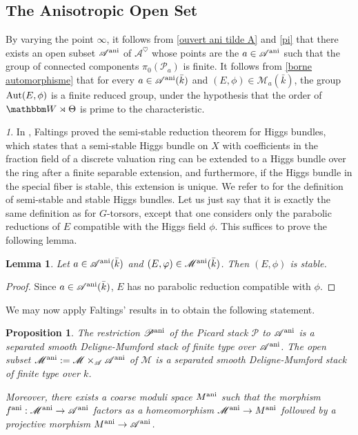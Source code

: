 \documentclass[12pt,english]{smfart}
\numberwithin{equation}{subsection}
\newtheorem{lemme}[equation]{Lemma}
\newtheorem{proposition}[equation]{Proposition}
\theoremstyle{remark}
\newtheorem{numero}[equation]{}
\newcommand\calA{{\mathscr A}}
\newcommand\calP{{\mathscr P}}
\newcommand\calM{{\mathscr M}}
\newcommand\bbW{{\mathbbm W}}
\newcommand\Aut{{\rm Aut}}
\newcommand\ani{{\rm ani}}
\begin{document}
\subsection{The Anisotropic Open Set}
\label{subsection : ouvert anisotrope}

By varying the point $\infty$, it follows from \ref{ouvert ani tilde A} and \ref{pi} that there exists an open subset $\calA^\ani$ of $\calA^\heartsuit$ whose points are the $a\in\calA^\ani$ such that the group of connected components $\pi_0(\calP_a)$ is finite. It follows from \ref{borne automorphisme} that for every $a\in\calA^\ani(\bar k)$ and $(E,\phi)\in\calM_a(\bar k)$, the group $\Aut(E,\phi)$ is a finite reduced group, under the hypothesis that the order of $\bbW\rtimes\Theta$ is prime to the characteristic.

\begin{numero}\label{ani auto}
In \cite[II.4]{Fa}, Faltings proved the semi-stable reduction theorem for Higgs bundles, which states that a semi-stable Higgs bundle on $X$ with coefficients in the fraction field of a discrete valuation ring can be extended to a Higgs bundle over the ring after a finite separable extension, and furthermore, if the Higgs bundle in the special fiber is stable, this extension is unique. We refer to \cite{Fa} for the definition of semi-stable and stable Higgs bundles. Let us just say that it is exactly the same definition as for $G$-torsors, except that one considers only the parabolic reductions of $E$ compatible with the Higgs field $\phi$. This suffices to prove the following lemma.
\end{numero}

\begin{lemme}\label{ani > stable}
Let $a\in\calA^\ani(\bar k)$ and $(E,\varphi)\in\calM^\ani(\bar k)$. Then $(E,\phi)$ is stable.
\end{lemme}

\begin{proof}
Since $a\in\calA^\ani(\bar k)$, $E$ has no parabolic reduction compatible with $\phi$.
\end{proof}

We may now apply Faltings' results in \cite{Fa} to obtain the following statement.

\begin{proposition}\label{propre}
The restriction $\calP^\ani$ of the Picard stack $\calP$ to $\calA^\ani$ is a separated smooth Deligne-Mumford stack of finite type over $\calA^\ani$. The open subset $\calM^\ani:=\calM\times_\calA\calA^\ani$ of $\calM$ is a separated smooth Deligne-Mumford stack of finite type over $k$.

Moreover, there exists a coarse moduli space $M^\ani$ such that the morphism $f^\ani:\calM^\ani\rightarrow\calA^\ani$ factors as a homeomorphism $\calM^\ani\rightarrow M^\ani$ followed by a projective morphism $M^\ani\rightarrow\calA^\ani$.
\end{proposition}
\end{document}
